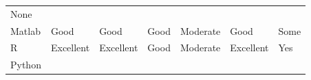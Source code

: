 \documentclass[]{book}
\begin{document}
\begin{longtable}[]{@{}lllllll@{}}
\begin{minipage}[t]{0.05\columnwidth}
None\strut
\end{minipage}\tabularnewline
\begin{minipage}[t]{0.08\columnwidth}\raggedright\strut
Matlab\strut
\end{minipage} & \begin{minipage}[t]{0.11\columnwidth}\raggedright\strut
Good\strut
\end{minipage} & \begin{minipage}[t]{0.13\columnwidth}\raggedright\strut
Good\strut
\end{minipage} & \begin{minipage}[t]{0.16\columnwidth}\raggedright\strut
Good\strut
\end{minipage} & \begin{minipage}[t]{0.11\columnwidth}\raggedright\strut
Moderate\strut
\end{minipage} & \begin{minipage}[t]{0.17\columnwidth}\raggedright\strut
Good\strut
\end{minipage} & \begin{minipage}[t]{0.05\columnwidth}\raggedright\strut
Some\strut
\end{minipage}\tabularnewline
\begin{minipage}[t]{0.08\columnwidth}\raggedright\strut
R\strut
\end{minipage} & \begin{minipage}[t]{0.11\columnwidth}\raggedright\strut
Excellent\strut
\end{minipage} & \begin{minipage}[t]{0.13\columnwidth}\raggedright\strut
Excellent\strut
\end{minipage} & \begin{minipage}[t]{0.16\columnwidth}\raggedright\strut
Good\strut
\end{minipage} & \begin{minipage}[t]{0.11\columnwidth}\raggedright\strut
Moderate\strut
\end{minipage} & \begin{minipage}[t]{0.17\columnwidth}\raggedright\strut
Excellent\strut
\end{minipage} & \begin{minipage}[t]{0.05\columnwidth}\raggedright\strut
Yes\strut
\end{minipage}\tabularnewline
\begin{minipage}[t]{0.08\columnwidth}\raggedright\strut
Python\strut
\end{minipage} & \begin{minipage}[t]{0.11\columnwidth}\raggedright\strut

\end{minipage}
\end{longtable}
\end{document}
